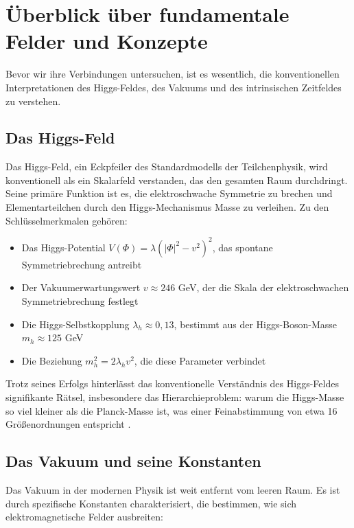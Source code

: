 \documentclass[12pt,a4paper]{article}
\begin{document}
	\section{Überblick über fundamentale Felder und Konzepte}
	\label{sec:fields_overview}
	
	Bevor wir ihre Verbindungen untersuchen, ist es wesentlich, die konventionellen Interpretationen des Higgs-Feldes, des Vakuums und des intrinsischen Zeitfeldes zu verstehen.
	
	\subsection{Das Higgs-Feld}
	\label{subsec:higgs_field}
	
	Das Higgs-Feld, ein Eckpfeiler des Standardmodells der Teilchenphysik, wird konventionell als ein Skalarfeld verstanden, das den gesamten Raum durchdringt. Seine primäre Funktion ist es, die elektroschwache Symmetrie zu brechen und Elementarteilchen durch den Higgs-Mechanismus Masse zu verleihen. Zu den Schlüsselmerkmalen gehören:
	
	\begin{itemize}
		\item Das Higgs-Potential $V(\Phi) = \lambda(|\Phi|^2 - v^2)^2$, das spontane Symmetriebrechung antreibt
		\item Der Vakuumerwartungswert $v \approx 246$ GeV, der die Skala der elektroschwachen Symmetriebrechung festlegt
		\item Die Higgs-Selbstkopplung $\lambda_h \approx 0,13$, bestimmt aus der Higgs-Boson-Masse $m_h \approx 125$ GeV
		\item Die Beziehung $m_h^2 = 2\lambda_h v^2$, die diese Parameter verbindet
	\end{itemize}
	
	Trotz seines Erfolgs hinterlässt das konventionelle Verständnis des Higgs-Feldes signifikante Rätsel, insbesondere das Hierarchieproblem: warum die Higgs-Masse so viel kleiner als die Planck-Masse ist, was einer Feinabstimmung von etwa 16 Größenordnungen entspricht \cite{Weinberg1989}.
	
	\subsection{Das Vakuum und seine Konstanten}
	\label{subsec:vacuum}
	
	Das Vakuum in der modernen Physik ist weit entfernt vom leeren Raum. Es ist durch spezifische Konstanten charakterisiert, die bestimmen, wie sich elektromagnetische Felder ausbreiten:
	
\end{document}
